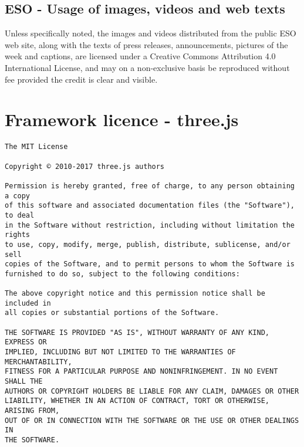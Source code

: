 \documentclass[twoside]{bhamthesis}
\begin{document}
\subsection{ESO - Usage of images, videos and web texts}

Unless specifically noted, the images and videos distributed from the public ESO web site, along with the texts of press releases, announcements, pictures of the week and captions, are licensed under a Creative Commons Attribution 4.0 International License, and may on a non-exclusive basis be reproduced without fee provided the credit is clear and visible.

\newpage

\section{Framework licence - three.js}

\begin{verbatim}
The MIT License

Copyright © 2010-2017 three.js authors

Permission is hereby granted, free of charge, to any person obtaining a copy
of this software and associated documentation files (the "Software"), to deal
in the Software without restriction, including without limitation the rights
to use, copy, modify, merge, publish, distribute, sublicense, and/or sell
copies of the Software, and to permit persons to whom the Software is
furnished to do so, subject to the following conditions:

The above copyright notice and this permission notice shall be included in
all copies or substantial portions of the Software.

THE SOFTWARE IS PROVIDED "AS IS", WITHOUT WARRANTY OF ANY KIND, EXPRESS OR
IMPLIED, INCLUDING BUT NOT LIMITED TO THE WARRANTIES OF MERCHANTABILITY,
FITNESS FOR A PARTICULAR PURPOSE AND NONINFRINGEMENT. IN NO EVENT SHALL THE
AUTHORS OR COPYRIGHT HOLDERS BE LIABLE FOR ANY CLAIM, DAMAGES OR OTHER
LIABILITY, WHETHER IN AN ACTION OF CONTRACT, TORT OR OTHERWISE, ARISING FROM,
OUT OF OR IN CONNECTION WITH THE SOFTWARE OR THE USE OR OTHER DEALINGS IN
THE SOFTWARE.
\end{verbatim}

\declaration
\end{document}
